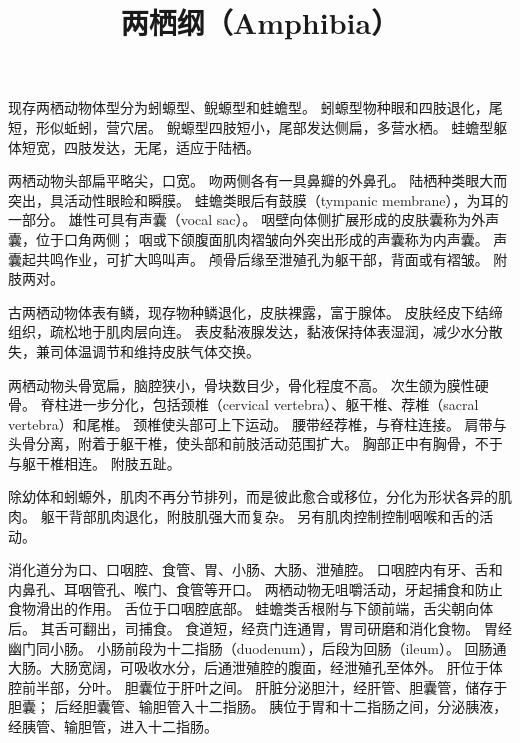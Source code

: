 \documentclass[11pt]{article}
\title{两栖纲（Amphibia）}
\date{}
\begin{document}
  \maketitle

  \linenumbers
现存两栖动物体型分为蚓螈型、鲵螈型和蛙蟾型。
蚓螈型物种眼和四肢退化，尾短，形似蚯蚓，营穴居。
鲵螈型四肢短小，尾部发达侧扁，多营水栖。
蛙蟾型躯体短宽，四肢发达，无尾，适应于陆栖。

\newline

两栖动物头部扁平略尖，口宽。
吻两侧各有一具鼻瓣的外鼻孔。
陆栖种类眼大而突出，具活动性眼睑和瞬膜。
蛙蟾类眼后有鼓膜（tympanic membrane），为耳的一部分。
雄性可具有声囊（vocal sac）。
咽壁向体侧扩展形成的皮肤囊称为外声囊，位于口角两侧；
咽或下颌腹面肌肉褶皱向外突出形成的声囊称为内声囊。
声囊起共鸣作业，可扩大鸣叫声。
颅骨后缘至泄殖孔为躯干部，背面或有褶皱。
附肢两对。

\newline

古两栖动物体表有鳞，现存物种鳞退化，皮肤裸露，富于腺体。
皮肤经皮下结缔组织，疏松地于肌肉层向连。
表皮黏液腺发达，黏液保持体表湿润，减少水分散失，兼司体温调节和维持皮肤气体交换。

\newline

两栖动物头骨宽扁，脑腔狭小，骨块数目少，骨化程度不高。
次生颌为膜性硬骨。
脊柱进一步分化，包括颈椎（cervical vertebra）、躯干椎、荐椎（sacral vertebra）和尾椎。
颈椎使头部可上下运动。
腰带经荐椎，与脊柱连接。
肩带与头骨分离，附着于躯干椎，使头部和前肢活动范围扩大。
胸部正中有胸骨，不于与躯干椎相连。
附肢五趾。

\newline

除幼体和蚓螈外，肌肉不再分节排列，而是彼此愈合或移位，分化为形状各异的肌肉。
躯干背部肌肉退化，附肢肌强大而复杂。
另有肌肉控制控制咽喉和舌的活动。

\newline

消化道分为口、口咽腔、食管、胃、小肠、大肠、泄殖腔。
口咽腔内有牙、舌和内鼻孔、耳咽管孔、喉门、食管等开口。
两栖动物无咀嚼活动，牙起捕食和防止食物滑出的作用。
舌位于口咽腔底部。
蛙蟾类舌根附与下颌前端，舌尖朝向体后。
其舌可翻出，司捕食。
食道短，经贲门连通胃，胃司研磨和消化食物。
胃经幽门同小肠。
小肠前段为十二指肠（duodenum），后段为回肠（ileum）。
回肠通大肠。大肠宽阔，可吸收水分，后通泄殖腔的腹面，经泄殖孔至体外。
肝位于体腔前半部，分叶。
胆囊位于肝叶之间。
肝脏分泌胆汁，经肝管、胆囊管，储存于胆囊；
后经胆囊管、输胆管入十二指肠。
胰位于胃和十二指肠之间，分泌胰液，经胰管、输胆管，进入十二指肠。
\end{document}
